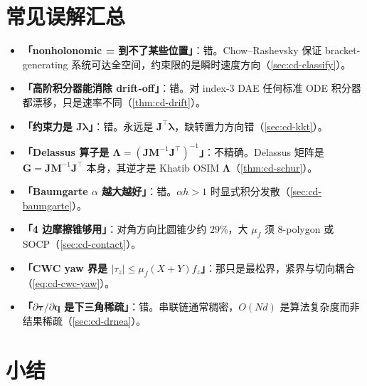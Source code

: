 \section*{常见误解汇总}
\begin{itemize}
  \item \textbf{「nonholonomic = 到不了某些位置」}：错。Chow--Rashevsky 保证 bracket-generating 系统可达全空间，约束限的是瞬时速度方向（\cref{sec:cd-classify}）。
  \item \textbf{「高阶积分器能消除 drift-off」}：错。对 index-3 DAE 任何标准 ODE 积分器都漂移，只是速率不同（\cref{thm:cd-drift}）。
  \item \textbf{「约束力是 $\mathbf J\boldsymbol\lambda$」}：错。永远是 $\mathbf J^\top\boldsymbol\lambda$，缺转置力方向错（\cref{sec:cd-kkt}）。
  \item \textbf{「Delassus 算子是 $\boldsymbol\Lambda=(\mathbf J\mathbf M^{-1}\mathbf J^\top)^{-1}$」}：不精确。Delassus 矩阵是 $\mathbf G=\mathbf J\mathbf M^{-1}\mathbf J^\top$ 本身，其逆才是 Khatib OSIM $\boldsymbol\Lambda$（\cref{thm:cd-schur}）。
  \item \textbf{「Baumgarte $\alpha$ 越大越好」}：错。$\alpha h>1$ 时显式积分发散（\cref{sec:cd-baumgarte}）。
  \item \textbf{「4 边摩擦锥够用」}：对角方向比圆锥少约 $29\%$，大 $\mu_f$ 须 8-polygon 或 SOCP（\cref{sec:cd-contact}）。
  \item \textbf{「CWC yaw 界是 $|\tau_z|\le\mu_f(X+Y)f_z$」}：那只是最松界，紧界与切向耦合（\cref{eq:cd-cwc-yaw}）。
  \item \textbf{「$\partial\boldsymbol\tau/\partial\mathbf q$ 是下三角稀疏」}：错。串联链通常稠密，$O(Nd)$ 是算法复杂度而非结果稀疏（\cref{sec:cd-drnea}）。
\end{itemize}

\section*{小结}

